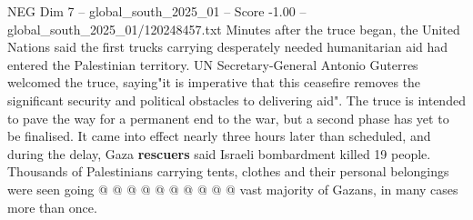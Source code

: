 \begin{textsample}{NEG Dim 7 – global\_south\_2025\_01 – Score -1.00 – global\_south\_2025\_01/120248457.txt}
Minutes after the truce began, the United Nations said the first trucks carrying desperately needed humanitarian aid had entered the Palestinian territory.
UN Secretary-General Antonio Guterres welcomed the truce, saying"it is imperative that this ceasefire removes the significant security and political obstacles to delivering aid".
The truce is intended to pave the way for a permanent end to the war, but a second phase has yet to be finalised.
It came into effect nearly three hours later than scheduled, and during the delay, Gaza \textbf{rescuers} said Israeli bombardment killed 19 people.
Thousands of Palestinians carrying tents, clothes and their personal belongings were seen going @ @ @ @ @ @ @ @ @ @ vast majority of Gazans, in many cases more than once.

\end{textsample}
